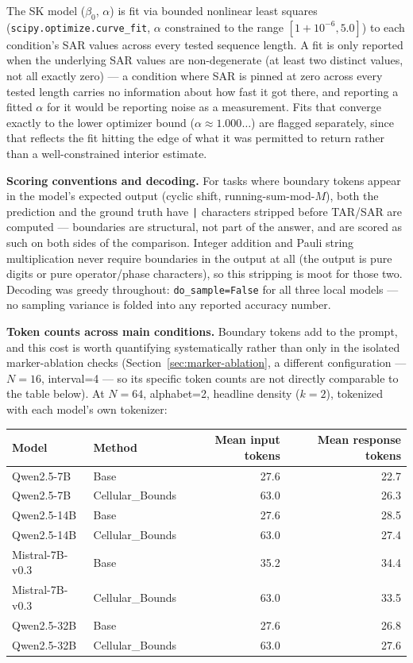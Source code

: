 \documentclass[11pt]{article}
\begin{document}
The SK model ($\beta_0$, $\alpha$) is fit via bounded nonlinear least squares (\texttt{scipy.optimize.curve\_fit}, $\alpha$ constrained to the range $[1 + 10^{-6}, 5.0]$) to each condition's SAR values across every tested sequence length. A fit is only reported when the underlying SAR values are non-degenerate (at least two distinct values, not all exactly zero) --- a condition where SAR is pinned at zero across every tested length carries no information about how fast it got there, and reporting a fitted $\alpha$ for it would be reporting noise as a measurement. Fits that converge exactly to the lower optimizer bound ($\alpha \approx 1.000\ldots$) are flagged separately, since that reflects the fit hitting the edge of what it was permitted to return rather than a well-constrained interior estimate.

\textbf{Scoring conventions and decoding.} For tasks where boundary tokens appear in the model's expected output (cyclic shift, running-sum-mod-$M$), both the prediction and the ground truth have \texttt{|} characters stripped before TAR/SAR are computed --- boundaries are structural, not part of the answer, and are scored as such on both sides of the comparison. Integer addition and Pauli string multiplication never require boundaries in the output at all (the output is pure digits or pure operator/phase characters), so this stripping is moot for those two. Decoding was greedy throughout: \texttt{do\_sample=False} for all three local models --- no sampling variance is folded into any reported accuracy number.

\textbf{Token counts across main conditions.} Boundary tokens add to the prompt, and this cost is worth quantifying systematically rather than only in the isolated marker-ablation checks (Section~\ref{sec:marker-ablation}, a different configuration --- $N=16$, interval=4 --- so its specific token counts are not directly comparable to the table below). At $N=64$, alphabet=2, headline density ($k=2$), tokenized with each model's own tokenizer:

\begin{table}[htbp]
\centering
\small
\begin{tabular}{llrr}
\toprule
Model & Method & Mean input tokens & Mean response tokens \\
\midrule
Qwen2.5-7B & Base & 27.6 & 22.7 \\
Qwen2.5-7B & Cellular\_Bounds & 63.0 & 26.3 \\
Qwen2.5-14B & Base & 27.6 & 28.5 \\
Qwen2.5-14B & Cellular\_Bounds & 63.0 & 27.4 \\
Mistral-7B-v0.3 & Base & 35.2 & 34.4 \\
Mistral-7B-v0.3 & Cellular\_Bounds & 63.0 & 33.5 \\
Qwen2.5-32B & Base & 27.6 & 26.8 \\
Qwen2.5-32B & Cellular\_Bounds & 63.0 & 27.6 \\
\bottomrule
\end{tabular}
\end{table}
\end{document}
